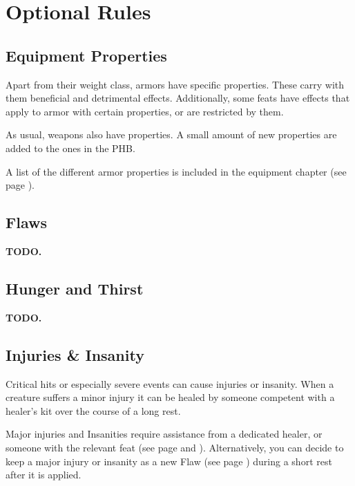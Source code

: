 \section{Optional Rules} \label{sec::optionalrules}

\subsection*{Equipment Properties} \label{ssec::equipmentproperties1}
    Apart from their weight class, armors have specific properties.
    These carry with them beneficial and detrimental effects.
    Additionally, some feats have effects that apply to armor with certain properties, or are restricted by them.

    As usual, weapons also have properties.
    A small amount of new properties are added to the ones in the PHB.

    A list of the different armor properties is included in the equipment chapter (see page \pageref{ssec::armorproperties}).





\subsection*{Flaws} \label{ssec::flaws}
    \textbf{TODO.}

\subsection*{Hunger and Thirst} \label{ssec::hungerandthirst}
    \textbf{TODO.}

\subsection*{Injuries \& Insanity} \label{ssec::injuriesandinsanity}
    Critical hits or especially severe events can cause injuries or insanity.
    When a creature suffers a minor injury it can be healed by someone competent with a healer's kit over the course of a long rest.

    Major injuries and Insanities require assistance from a dedicated healer, or someone with the relevant feat (see page \pageref{feat::physician} and \pageref{feat::therapist}).
    Alternatively, you can decide to keep a major injury or insanity as a new Flaw (see page \pageref{ssec::flaws}) during a short rest after it is applied.

